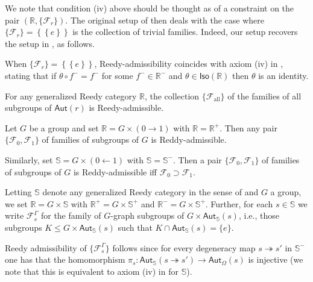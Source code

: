\documentclass[a4paper,10pt
,draft
]{article}%
\begin{document}
We note that condition (iv) above should be thought as of a constraint on the pair 
$(\mathbb{R},\{\mathcal{F}_r\})$.
The original setup of \cite{BM11} then deals with the case
where $\{ \mathcal{F}_r \} =
 \left\{ \left\{ e \right\} \right\}$
is the collection of trivial families. Indeed, our setup recovers
the setup in \cite{BM11}, as follows.

\begin{example}
	When $\{ \mathcal{F}_r \} =
 \left\{ \left\{ e \right\} \right\}$, Reedy-admissibility coincides with axiom (iv) in \cite[Def. 1.1]{BM11},
stating that if $\theta \circ f^{-} = f^{-}$
for some $f^- \in \mathbb{R}^{-}$ and 
$\theta \in \mathsf{Iso}(\mathbb{R})$ then $\theta$ is an identity.
\end{example}

\begin{example}
For any generalized Reedy category $\mathbb{R}$, the collection $\{\mathcal{F}_{\text{all}}\}$
of the families of all subgroups of $\mathsf{Aut}(r)$
is Reedy-admissible.
\end{example}

\begin{example}
	Let $G$ be a group and set $\mathbb{R} = G \times (0 \to 1)$ with $\mathbb{R} = \mathbb{R}^+$. Then any pair 
	$\{\mathcal{F}_0,\mathcal{F}_1\}$
	of families of subgroups of $G$ is Reddy-admissible.
	
	Similarly, set $\mathbb{S} = G \times (0 \leftarrow 1)$
	with $\mathbb{S} = \mathbb{S}^-$. Then a pair
	$\{\mathcal{F}_0,\mathcal{F}_1\}$
	of families of subgroups of $G$ is Reddy-admissible
	iff $\mathcal{F}_0 \supset \mathcal{F}_1$.
\end{example}


\begin{example}\label{GGRAPHREEDY EX}
	Letting $\mathbb{S}$ denote any generalized Reedy category in the sense of \cite[Def. 1.1]{BM11} and $G$ a group,
	we set $\mathbb{R} = G \times \mathbb{S}$
	with $\mathbb{R}^+ = G \times \mathbb{S}^+$ and 
	$\mathbb{R}^- = G \times \mathbb{S}^+$.
	Further, for each $s \in \mathbb{S}$ we write
	$\mathcal{F}_s^{\Gamma}$ for the family of 
	$G$-graph subgroups of $G \times \mathsf{Aut}_{\mathbb{S}}(s)$, i.e., those subgroups 
	$K \leq G \times \mathsf{Aut}_{\mathbb{S}}(s)$ such that $K \cap \mathsf{Aut}_{\mathbb{S}}(s) = \{e\}$.
	
	Reedy admissibility of $\{\mathcal{F}_s^{\Gamma}\}$ follows since for every degeneracy map 
	$s \twoheadrightarrow s'$ in $\mathbb{S}^-$ one has that the homomorphism
	$\pi_s \colon \mathsf{Aut}_{\mathbb{S}}(s \twoheadrightarrow s')
	\to \mathsf{Aut}_{\Omega}(s)$ is injective
	(we note that this is equivalent to axiom (iv) in \cite[Def. 1.1]{BM11} for $\mathbb{S}$).
\end{example}
\end{document}
